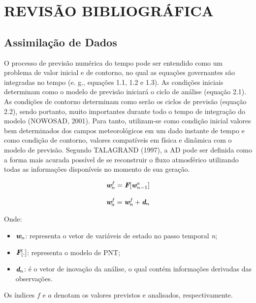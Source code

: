 \hypertarget{estilo:capitulo}{}
\chapter{REVISÃO BIBLIOGRÁFICA}

\section{Assimilação de Dados}
\label{ss:assimdados}

O processo de previsão numérica do tempo pode ser entendido como um problema de valor inicial e de contorno, no qual as equações governantes são integradas no tempo (e. g., equações 1.1, 1.2 e 1.3). As condições iniciais determinam como o modelo de previsão iniciará o ciclo de análise (equação 2.1). As condições de contorno determinam como serão os ciclos de previsão (equação 2.2), sendo portanto, muito importantes durante todo o tempo de integração do modelo (NOWOSAD, 2001). Para tanto, utilizam-se como condição inicial valores bem determinados dos campos meteorológicos em um dado instante de tempo e como condição de contorno, valores compatíveis em física e dinâmica com o modelo de previsão. Segundo TALAGRAND (1997), a AD pode ser definida como a forma mais acurada possível de se reconstruir o fluxo atmosférico utilizando todas as informações disponíveis no momento de sua geração.

\begin{equation}
\textit{\textbf{w}}^{f}_{n}=\textit{\textbf{F}}[\textit{\textbf{w}}^{a}_{n-1}]
 \label{form04}
\end{equation}

\begin{equation}
\textit{\textbf{w}}^{f}_{a}=\textit{\textbf{w}}^{f}_{n}+\textit{\textbf{d}}_{n}
 \label{form05}
\end{equation}

Onde:

\begin{itemize}
\item $\textit{\textbf{w}}_{n}$: representa o vetor de variáveis de estado no passo temporal \textit{n};
\item $\textit{\textbf{F}}[.]$: representa o modelo de PNT;
\item $\textit{\textbf{d}}_{n}$: é o vetor de inovação da análise, o qual contém informações derivadas das observações.
\end{itemize}

Os índices $\textit{f}$ e $\textit{a}$ denotam os valores previstos e analisados, respectivamente.

